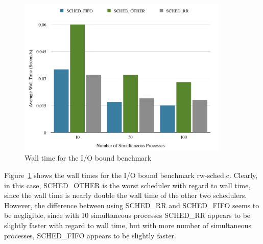 \documentclass[12pt]{article}
\begin{document}
\begin{figure}[!htb]
  \begin{center}
    \includegraphics[width=100mm]{IOWall.png}
    \caption{Wall time for the I/O bound benchmark}
    \label{fig:iowall}
  \end{center} 
\end{figure}

Figure~\ref{fig:iowall} shows the wall times for the I/O bound benchmark 
{\ttfamily rw-sched.c}. Clearly, in this case, {\ttfamily SCHED\_OTHER} is the
worst scheduler with regard to wall time, since the wall time is nearly double
the wall time of the other two schedulers. However, the difference between 
using {\ttfamily SCHED\_RR} and {\ttfamily SCHED\_FIFO} seems to be negligible,
since with 10 simultaneous processes {\ttfamily SCHED\_RR} appears to be slightly
faster with regard to wall time, but with more number of simultaneous processes,
{\ttfamily SCHED\_FIFO} appears to be slightly faster. 
\end{document}
